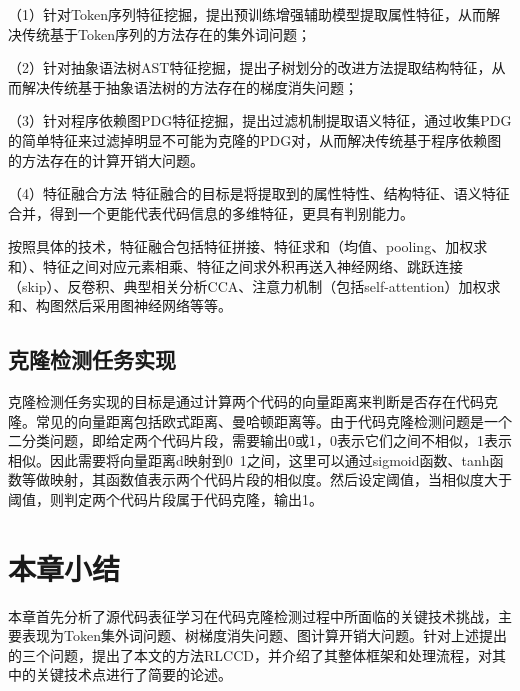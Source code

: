 （1）针对Token序列特征挖掘，提出预训练增强辅助模型提取属性特征，从而解决传统基于Token序列的方法存在的集外词问题；

（2）针对抽象语法树AST特征挖掘，提出子树划分的改进方法提取结构特征，从而解决传统基于抽象语法树的方法存在的梯度消失问题；

（3）针对程序依赖图PDG特征挖掘，提出过滤机制提取语义特征，通过收集PDG的简单特征来过滤掉明显不可能为克隆的PDG对，从而解决传统基于程序依赖图的方法存在的计算开销大问题。

（4）特征融合方法
特征融合的目标是将提取到的属性特性、结构特征、语义特征合并，得到一个更能代表代码信息的多维特征，更具有判别能力。

按照具体的技术，特征融合包括特征拼接、特征求和（均值、pooling、加权求和）、特征之间对应元素相乘、特征之间求外积再送入神经网络、跳跃连接（skip）、反卷积、典型相关分析CCA、注意力机制（包括self-attention）加权求和、构图然后采用图神经网络等等。

\subsection{克隆检测任务实现}
克隆检测任务实现的目标是通过计算两个代码的向量距离来判断是否存在代码克隆。常见的向量距离包括欧式距离、曼哈顿距离等。由于代码克隆检测问题是一个二分类问题，即给定两个代码片段，需要输出0或1，0表示它们之间不相似，1表示相似。因此需要将向量距离d映射到0~1之间，这里可以通过sigmoid函数、tanh函数等做映射，其函数值表示两个代码片段的相似度。然后设定阈值，当相似度大于阈值，则判定两个代码片段属于代码克隆，输出1。

\section{本章小结}
本章首先分析了源代码表征学习在代码克隆检测过程中所面临的关键技术挑战，主要表现为Token集外词问题、树梯度消失问题、图计算开销大问题。针对上述提出的三个问题，提出了本文的方法RLCCD，并介绍了其整体框架和处理流程，对其中的关键技术点进行了简要的论述。
